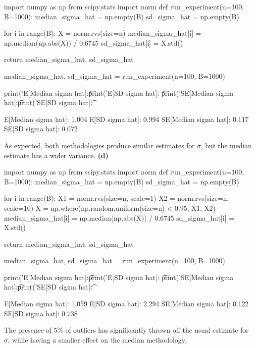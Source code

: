 \begin{python}
import numpy as np
from scipy.stats import norm
def run_experiment(n=100, B=1000):
    median_sigma_hat = np.empty(B)
    sd_sigma_hat = np.empty(B)
    
    for i in range(B):
        X = norm.rvs(size=n)
        median_sigma_hat[i] = np.median(np.abs(X)) / 0.6745
        sd_sigma_hat[i] = X.std()
    
    return median_sigma_hat, sd_sigma_hat
\end{python}

\begin{python}
median_sigma_hat, sd_sigma_hat = run_experiment(n=100, B=1000)
\end{python}

\begin{python}
print('E[Median sigma hat]:\t %
print('E[SD sigma hat]:   \t %
print('SE[Median sigma hat]:\t %
print('SE[SD sigma hat]:\t %
\end{python}
\begin{console}
E[Median sigma hat]:     1.004
E[SD sigma hat]:         0.994
SE[Median sigma hat]:    0.117
SE[SD sigma hat]:        0.072
\end{console}
As expected, both methodologies produce similar estimates for
\(\sigma\), but the median estimate has a wider variance.
\textbf{(d)}

\begin{python}
import numpy as np
from scipy.stats import norm
def run_experiment(n=100, B=1000):
    median_sigma_hat = np.empty(B)
    sd_sigma_hat = np.empty(B)
    
    for i in range(B):
        X1 = norm.rvs(size=n, scale=1)
        X2 = norm.rvs(size=n, scale=10)
        X = np.where(np.random.uniform(size=n) < 0.95, X1, X2)
        median_sigma_hat[i] = np.median(np.abs(X)) / 0.6745
        sd_sigma_hat[i] = X.std()
    
    return median_sigma_hat, sd_sigma_hat
\end{python}

\begin{python}
median_sigma_hat, sd_sigma_hat = run_experiment(n=100, B=1000)
\end{python}

\begin{python}
print('E[Median sigma hat]:\t %
print('E[SD sigma hat]:   \t %
print('SE[Median sigma hat]:\t %
print('SE[SD sigma hat]:\t %
\end{python}
\begin{console}
E[Median sigma hat]:     1.059
E[SD sigma hat]:         2.294
SE[Median sigma hat]:    0.122
SE[SD sigma hat]:        0.738
\end{console}
The presence of 5\% of outliers has significantly thrown off the usual
estimate for \(\sigma\), while having a smaller effect on the median
methodology.

